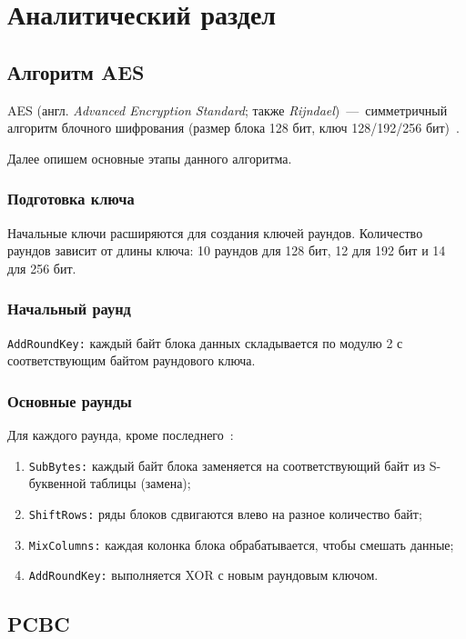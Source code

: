 \chapter{Аналитический раздел}

\section{Алгоритм AES}

AES (англ. \textit{Advanced Encryption Standard}; также \textit{Rijndael})~---~симметричный алгоритм блочного шифрования (размер блока 128 бит, ключ 128/192/256 бит)~\cite{aes}.

Далее опишем основные этапы данного алгоритма.

\subsection{Подготовка ключа}
Начальные ключи расширяются для создания ключей раундов. 
Количество раундов зависит от длины ключа: 10 раундов для 128 бит, 12 для 192 бит и 14 для 256 бит.

\subsection{Начальный раунд}
\texttt{AddRoundKey:} каждый байт блока данных складывается по модулю 2 с соответствующим байтом раундового ключа.

\subsection{Основные раунды}
Для каждого раунда, кроме последнего~\cite{aes}:
\begin{enumerate}
	\item \texttt{SubBytes:} каждый байт блока заменяется на соответствующий байт из S-буквенной таблицы (замена);
	\item \texttt{ShiftRows:} ряды блоков сдвигаются влево на разное количество байт;
	\item \texttt{MixColumns:} каждая колонка блока обрабатывается, чтобы смешать данные;
	\item \texttt{AddRoundKey:} выполняется XOR с новым раундовым ключом.
\end{enumerate}

\section{PCBC}

